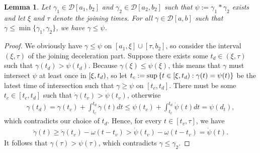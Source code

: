 \documentclass[a4paper]{article}
\theoremstyle{definition}
\theoremstyle{plain}
\newtheorem{lemma}{Lemma\hspace{0.25em}\ignorespaces}
\begin{document}
\begin{lemma}
  Let $\gamma_{1} \in \mathcal{D}[a_{1}, b_{2}]$ and
  $\gamma_{2} \in \mathcal{D}[a_{2}, b_{2}]$ such that $\psi := \gamma_{1} * \gamma_{2}$ exists and
  let $\xi$ and $\tau$ denote the joining times. For all $\gamma \in \mathcal{D}[a, b]$ such
  that $\gamma \leq \min\{\gamma_{1}, \gamma_{2}\}$, we have $\gamma \leq \psi$.
\end{lemma}
\begin{proof}
  We obviously have $\gamma \leq \psi$ on $[a_{1}, \xi] \cup [\tau, b_{2}]$, so
  consider the interval $(\xi, \tau)$ of the joining deceleration part. Suppose
  there exists some $t_{d} \in (\xi, \tau)$ such that
  $\gamma(t_{d}) > \psi(t_{d})$. Because $\gamma(\xi) \leq \psi(\xi)$, this
  means that $\gamma$ must intersect $\psi$ at least once in
  $[\xi,t_{d})$, so let
  $t_{c} := \sup \, \{ t \in [\xi,t_{d}) : \gamma(t) = \psi(t) \}$ be
  the latest time of intersection such that $\gamma \geq \psi$ on
  $[t_{c}, t_{d}]$. There must be some $t_{c} \in [t_{c}, t_{d}]$ such that
  $\dot{\gamma}(t_{v}) > \dot{\psi}(t_{v})$, otherwise
  \begin{align*}
    \gamma(t_{d}) = \gamma(t_{c}) + \int_{t_{c}}^{t_{d}} \dot{\gamma}(t) dt \leq \psi(t_{c}) + \int_{t_{c}}^{t_{d}} \dot{\psi}(t) dt = \psi(d_{t}) ,
  \end{align*}
  which contradicts our choice of $t_{d}$. Hence, for every
  $t \in [t_{v}, \tau]$, we have
  \begin{align*}
    \dot{\gamma}(t) \geq \dot{\gamma}(t_{v}) - \omega (t - t_{v}) > \dot{\psi}(t_{v}) - \omega(t - t_{v}) = \dot{\psi}(t) .
  \end{align*}
  It follows that $\gamma(\tau) > \psi(\tau)$, which contradicts
  $\gamma \leq \gamma_{2}$.
\end{proof}
\end{document}
